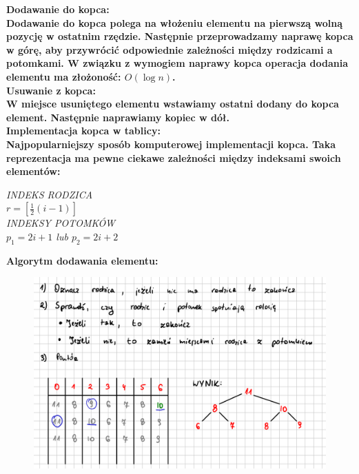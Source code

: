 \documentclass[a4paper,12pt]{article}
\newcommand{\h}[1]{\noindent \bf #1 \rm \\ \noindent}
\newcommand{\italic}[1]{\it #1 \rm}
\begin{document}
\h{Dodawanie do kopca:}
Dodawanie do kopca polega na włożeniu elementu na pierwszą wolną pozycję w ostatnim rzędzie. Następnie przeprowadzamy naprawę kopca w górę, aby przywrócić odpowiednie zależności między rodzicami a potomkami. W związku z wymogiem naprawy kopca operacja dodania elementu ma złożoność: $O(\log n)$.\\

\h{Usuwanie z kopca:}
W miejsce usuniętego elementu wstawiamy ostatni dodany do kopca element. Następnie naprawiamy kopiec w dół.\\

\h{Implementacja kopca w tablicy:}
Najpopularniejszy sposób komputerowej implementacji kopca. Taka reprezentacja ma pewne ciekawe zależności między indeksami swoich elementów:
\begin{center}
	\italic{INDEKS RODZICA}\\
	$r = [ \frac{1}{2}(i-1) ]$ \\
	\vspace{5mm}
	\italic{INDEKSY POTOMKÓW}\\
	$p_1 = 2i+1$ lub $p_2 = 2i+2$
\end{center}

\newpage
\h{Algorytm dodawania elementu:}
\begin{figure}[H]
	\centering
	\includegraphics[width=14cm]{fig2.png}
\end{figure}
\end{document}
